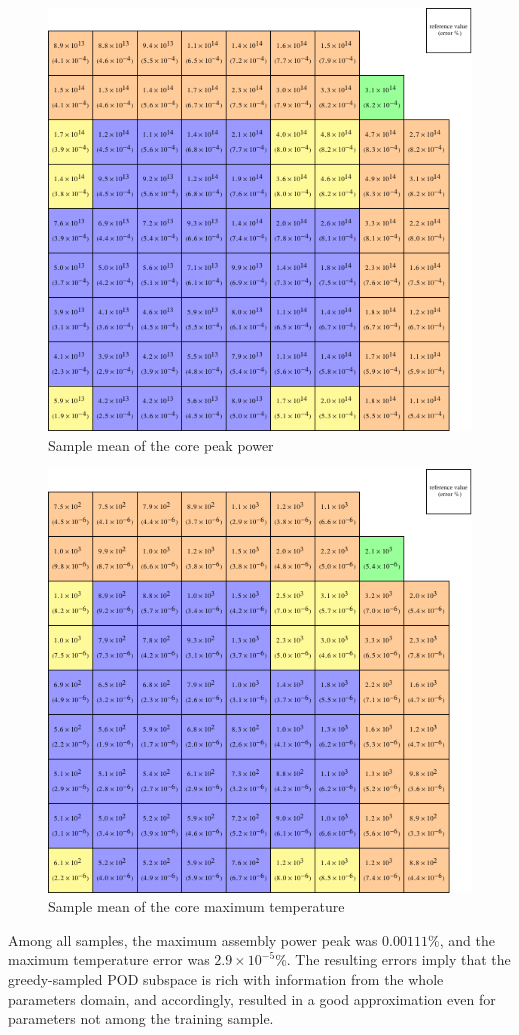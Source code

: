 \documentclass[]{interact}
\theoremstyle{plain}%
\theoremstyle{definition}
\theoremstyle{remark}
\begin{document}
\begin{figure}[H]
	\centering
	\includegraphics[scale=1]{../figures/LRA_power_mean_err.pdf}
	\caption{Sample mean of the core peak power}
	\label{fig:peak power mean error}
\end{figure}

\begin{figure}[H]
	\centering
	\includegraphics[scale=1]{../figures/LRA_T_mean_err_peak.pdf}
	\caption{Sample mean of the core maximum temperature}
	\label{fig:T mean error}
\end{figure}
Among all samples, the maximum assembly power peak was $0.00111\%$, and the maximum temperature error was $2.9\times10^{-5}\%$.
The resulting errors imply that the greedy-sampled POD subspace is rich with information from the whole parameters domain,
and accordingly, resulted in a good approximation even for parameters not among the training sample.
\end{document}
